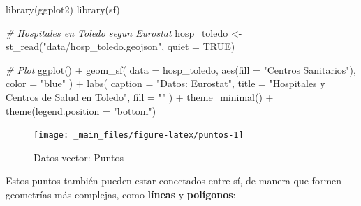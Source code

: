 \documentclass[
]{report}
\newenvironment{Shaded}{\begin{snugshade}}{\end{snugshade}}
\newcommand{\AttributeTok}[1]{\textcolor[rgb]{0.77,0.63,0.00}{#1}}
\newcommand{\CommentTok}[1]{\textcolor[rgb]{0.56,0.35,0.01}{\textit{#1}}}
\newcommand{\ConstantTok}[1]{\textcolor[rgb]{0.00,0.00,0.00}{#1}}
\newcommand{\FunctionTok}[1]{\textcolor[rgb]{0.00,0.00,0.00}{#1}}
\newcommand{\NormalTok}[1]{#1}
\newcommand{\OtherTok}[1]{\textcolor[rgb]{0.56,0.35,0.01}{#1}}
\newcommand{\SpecialCharTok}[1]{\textcolor[rgb]{0.00,0.00,0.00}{#1}}
\newcommand{\StringTok}[1]{\textcolor[rgb]{0.31,0.60,0.02}{#1}}
\begin{document}
\begin{Shaded}
\begin{Highlighting}[]

\FunctionTok{library}\NormalTok{(ggplot2)}
\FunctionTok{library}\NormalTok{(sf)}


\CommentTok{\# Hospitales en Toledo segun Eurostat}
\NormalTok{hosp\_toledo }\OtherTok{\textless{}{-}} \FunctionTok{st\_read}\NormalTok{(}\StringTok{"data/hosp\_toledo.geojson"}\NormalTok{, }\AttributeTok{quiet =} \ConstantTok{TRUE}\NormalTok{)}

\CommentTok{\# Plot}
\FunctionTok{ggplot}\NormalTok{() }\SpecialCharTok{+}
  \FunctionTok{geom\_sf}\NormalTok{(}
    \AttributeTok{data =}\NormalTok{ hosp\_toledo, }\FunctionTok{aes}\NormalTok{(}\AttributeTok{fill =} \StringTok{"Centros Sanitarios"}\NormalTok{),}
    \AttributeTok{color =} \StringTok{"blue"}
\NormalTok{  ) }\SpecialCharTok{+}
  \FunctionTok{labs}\NormalTok{(}
    \AttributeTok{caption =} \StringTok{"Datos: Eurostat"}\NormalTok{,}
    \AttributeTok{title =} \StringTok{"Hospitales y Centros de Salud en Toledo"}\NormalTok{,}
    \AttributeTok{fill =} \StringTok{""}
\NormalTok{  ) }\SpecialCharTok{+}
  \FunctionTok{theme\_minimal}\NormalTok{() }\SpecialCharTok{+}
  \FunctionTok{theme}\NormalTok{(}\AttributeTok{legend.position =} \StringTok{"bottom"}\NormalTok{)}
\end{Highlighting}
\end{Shaded}

\begin{figure}

{\centering \texttt{[image: \_main\_files/figure-latex/puntos-1]} 

}

\caption{Datos vector: Puntos}\label{fig:puntos}
\end{figure}

Estos puntos también pueden estar conectados entre sí, de manera que formen
geometrías más complejas, como \textbf{líneas} y \textbf{polígonos}:
\end{document}
